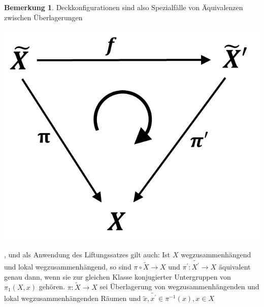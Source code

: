 \documentclass[a4paper,11pt,notitlepage]{report}
\theoremstyle{definition}
\newtheorem{remark}{Bemerkung}[chapter]
\begin{document}
\begin{remark}
	Deckkonfigurationen sind also Spezialfälle von Äquivalenzen zwischen Überlagerungen \begin{center}
	 	\includegraphics[scale=0.5]{images/2011_12_22_Bild5.png}
	 \end{center}, und als Anwendung des Liftungssatzes gilt auch:
	\newline
	Ist $X$ wegzusammenhängend und lokal wegzusammenhängend, so sind $\pi \circ \widetilde{X} \rightarrow X$ und $\pi^\prime \colon \widetilde{X^\prime} \rightarrow X$ äquivalent genau dann, wenn sie zur gleichen Klasse konjugierter Untergruppen von $\pi_1(X,x)$ gehören.
	\newline
	$\pi \colon \widetilde{X} \rightarrow X$ sei Überlagerung von wegzusammenhängenden und lokal wegzusammenhängenden Räumen und $\widetilde{x}, \widetilde{x^\prime} \in \pi^{-1}(x), x \in X$ \begin{center}

\end{center}
\end{remark}
\end{document}
